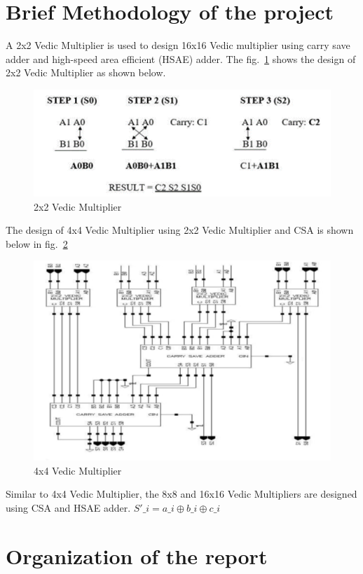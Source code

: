 \section[Brief Methodology of the project]{\textbf{Brief Methodology of the project}}
A 2x2 Vedic Multiplier is used to design 16x16 Vedic multiplier using carry save adder and high-speed area efficient (HSAE) adder. The fig.~\ref{fig:x1} shows the design of 2x2 Vedic Multiplier as shown below.
\begin{figure}[htb]
\centering
	\includegraphics[scale=1]{Figures/x1}	
	\caption{2x2 Vedic Multiplier}
	\label{fig:x1}
\end{figure}
The design of 4x4 Vedic Multiplier using 2x2 Vedic Multiplier and CSA is shown below in fig.~\ref{fig:x2}
\begin{figure}[htb]
	\centering
	\includegraphics[scale=1]{Figures/x2}	
	\caption{4x4 Vedic Multiplier}
	\label{fig:x2}
\end{figure}
Similar to 4x4 Vedic Multiplier, the 8x8 and 16x16 Vedic Multipliers are designed using CSA and HSAE adder.
$S'\_{i}= a\_{i} \oplus b\_{i} \oplus c\_{i}$

\section[Organization of the report]{\textbf{Organization of the report}}

